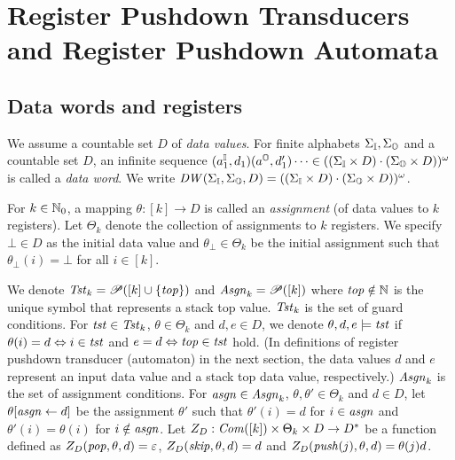 \section{Register Pushdown Transducers and Register Pushdown Automata}
\subsection{Data words and registers}
We assume a countable set $D$ of \emph{data values}.
For finite alphabets $\Sigma_{\mathbb{I}},\Sigma_{\mathbb{O}}$ and a countable set $D$,
an infinite sequence $(a^{\mathbb{I}}_1,d_1)(a^{\mathbb{O}},d'_1)\cdots \in ((\Sigma_{\mathbb{I}}\times D)\cdot(\Sigma_{\mathbb{O}}\times D))^\omega$ is called a \emph{data word}.
We write $\mathit{DW}(\Sigma_{\mathbb{I}},\Sigma_{\mathbb{O}},D)=((\Sigma_{\mathbb{I}}\times D)\cdot(\Sigma_{\mathbb{O}}\times D))^\omega$.

For $k\in\mathbb{N}_0$, a mapping $\theta: [k] \to D$ is called an \emph{assignment}
(of data values to $k$ registers).
Let $\Theta_k$ denote the collection of assignments to $k$ registers.
We specify $\bot\in D$ as the initial data value and
$\theta_\bot\in\Theta_k$ be the initial assignment such that
$\theta_\bot(i)=\bot$ for all $i\in[k]$.

We denote $\mathit{Tst}_k = \mathscr{P}([k]\cup\{\mathit{top}\})$ and $\mathit{Asgn}_k = \mathscr{P}([k])$
where $\mathit{top}\notin\mathbb{N}$ is the unique symbol that represents a stack top value.
$\mathit{Tst}_k$ is the set of guard conditions.
For $\mathit{tst}\in\mathit{Tst}_k$, $\theta\in\Theta_k$ and $d,e\in D$,
we denote $\theta,d,e\models\mathit{tst}$ if $\theta(i) = d \Leftrightarrow i\in\mathit{tst}$
and $e = d \Leftrightarrow \mathit{top}\in\mathit{tst}$ hold.
(In definitions of register pushdown transducer (automaton) in the next section,
the data values $d$ and $e$ represent an input data value and a stack top data value, respectively.)
$\mathit{Asgn}_k$ is the set of assignment conditions.
For $\mathit{asgn}\in\mathit{Asgn}_k$, $\theta,\theta'\in\Theta_k$ and $d\in D$,
let $\theta[\mathit{asgn}\leftarrow d]$ be the assignment
$\theta'$ such that $\theta'(i) = d$ for $i\in\mathit{asgn}$ and $\theta'(i)=\theta(i)$ for $i\notin\mathit{asgn}$.
Let $Z_D: \mathit{Com}([k])\times \Theta_k\times D \to D^*$ be a function defined as
$Z_D(\mathit{pop},\theta,d)=\varepsilon$, $Z_D(\mathit{skip},\theta,d)=d$ and $Z_D(\mathit{push}(j),\theta,d)=\theta(j)d$.

